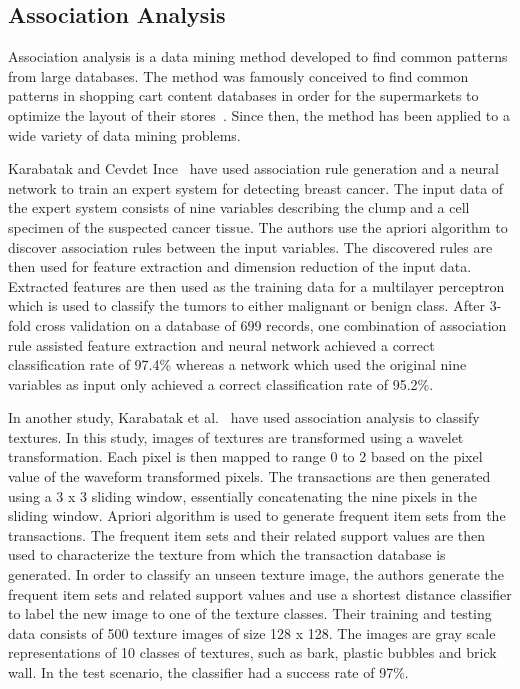 \subsection{Association Analysis}

Association analysis is a data mining method developed to find common patterns from large databases. The method was famously conceived to find common patterns in shopping cart content databases in order for the supermarkets to optimize the layout of their stores~\cite{Agrawal:1993:MAR:170036.170072}. Since then, the method has been applied to a wide variety of data mining problems.

Karabatak and Cevdet Ince~\cite{KARABATAK20093465} have used association rule generation and a neural network to train an expert system for detecting breast cancer. The input data of the expert system consists of nine variables describing the clump and a cell specimen of the suspected cancer tissue. The authors use the apriori algorithm to discover association rules between the input variables. The discovered rules are then used for feature extraction and dimension reduction of the input data. Extracted features are then used as the training data for a multilayer perceptron which is used to classify the tumors to either malignant or benign class. After 3-fold cross validation on a database of 699 records, one combination of association rule assisted feature extraction and neural network achieved a correct classification rate of 97.4\% whereas a network which used the original nine variables as input only achieved a correct classification rate of 95.2\%.

In another study, Karabatak et al.~\cite{KARABATAK201132} have used association analysis to classify textures. In this study, images of textures are transformed using a wavelet transformation. Each pixel is then mapped to range 0 to 2 based on the pixel value of the waveform transformed pixels. The transactions are then generated using a 3 x 3 sliding window, essentially concatenating the nine pixels in the sliding window. Apriori algorithm is used to generate frequent item sets from the transactions. The frequent item sets and their related support values are then used to characterize the texture from which the transaction database is generated. In order to classify an unseen texture image, the authors generate the frequent item sets and related support values and use a shortest distance classifier to label the new image to one of the texture classes. Their training and testing data consists of 500 texture images of size 128 x 128. The images are gray scale representations of 10 classes of textures, such as bark, plastic bubbles and brick wall. In the test scenario, the classifier had a success rate of 97\%. 